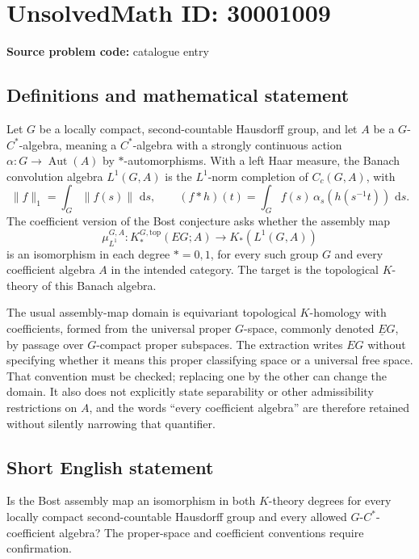 \documentclass[11pt]{article}
\newcommand{\dd}{\,\mathrm{d}}
\begin{document}
\section*{UnsolvedMath ID: 30001009}
\textbf{Source problem code:} catalogue entry
\subsection{Definitions and mathematical statement}
Let \(G\) be a locally compact, second-countable Hausdorff group, and let \(A\) be a \(G\)-\(C^*\)-algebra, meaning a \(C^*\)-algebra with a strongly continuous action \(\alpha:G\to\operatorname{Aut}(A)\) by \(*\)-automorphisms. With a left Haar measure, the Banach convolution algebra \(L^1(G,A)\) is the \(L^1\)-norm completion of \(C_c(G,A)\), with
\[
\|f\|_1=\int_G\|f(s)\|\,\dd s,
\qquad
(f*h)(t)=\int_G f(s)\,\alpha_s(h(s^{-1}t))\,\dd s.
\]
The coefficient version of the Bost conjecture asks whether the assembly map
\[
\mu^{G,A}_{L^1}:K_*^{G,\mathrm{top}}(EG;A)
\longrightarrow K_*(L^1(G,A))
\]
is an isomorphism in each degree \(*=0,1\), for every such group \(G\) and every coefficient algebra \(A\) in the intended category. The target is the topological \(K\)-theory of this Banach algebra.

The usual assembly-map domain is equivariant topological \(K\)-homology with coefficients, formed from the universal proper \(G\)-space, commonly denoted \(\underline EG\), by passage over \(G\)-compact proper subspaces. The extraction writes \(EG\) without specifying whether it means this proper classifying space or a universal free space. That convention must be checked; replacing one by the other can change the domain. It also does not explicitly state separability or other admissibility restrictions on \(A\), and the words ``every coefficient algebra'' are therefore retained without silently narrowing that quantifier.
\subsection{Short English statement}
Is the Bost assembly map an isomorphism in both \(K\)-theory degrees for every locally compact second-countable Hausdorff group and every allowed \(G\)-\(C^*\)-coefficient algebra? The proper-space and coefficient conventions require confirmation.
\end{document}
